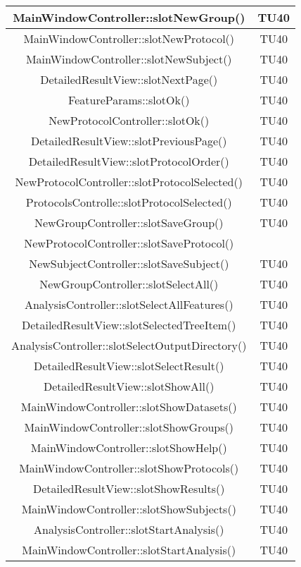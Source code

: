 \begin{center}
\begin{longtable}{|c|c|}
\hline 
MainWindowController::slotNewGroup() & TU40 \\
\hline 
MainWindowController::slotNewProtocol() & TU40 \\
\hline 
MainWindowController::slotNewSubject() & TU40 \\
\hline 
DetailedResultView::slotNextPage() & TU40 \\
\hline 
FeatureParams::slotOk() & TU40 \\
\hline 
NewProtocolController::slotOk() & TU40 \\
\hline 
DetailedResultView::slotPreviousPage() & TU40 \\
\hline 
DetailedResultView::slotProtocolOrder() & TU40 \\
\hline 
NewProtocolController::slotProtocolSelected() & TU40 \\
\hline 
ProtocolsControlle::slotProtocolSelected() & TU40 \\
\hline 
NewGroupController::slotSaveGroup() & TU40 \\
\hline 
NewProtocolController::slotSaveProtocol() &  \\
\hline 
NewSubjectController::slotSaveSubject() & TU40 \\
\hline 
NewGroupController::slotSelectAll() & TU40 \\
\hline 
AnalysisController::slotSelectAllFeatures() & TU40 \\
\hline 
DetailedResultView::slotSelectedTreeItem() & TU40 \\
\hline 
AnalysisController::slotSelectOutputDirectory() & TU40 \\
\hline 
DetailedResultView::slotSelectResult() & TU40 \\
\hline 
DetailedResultView::slotShowAll() & TU40 \\
\hline 
MainWindowController::slotShowDatasets() & TU40 \\
\hline 
MainWindowController::slotShowGroups() & TU40 \\
\hline 
MainWindowController::slotShowHelp() & TU40 \\
\hline 
MainWindowController::slotShowProtocols() & TU40 \\
\hline 
DetailedResultView::slotShowResults() & TU40 \\
\hline 
MainWindowController::slotShowSubjects() & TU40 \\
\hline 
AnalysisController::slotStartAnalysis() & TU40 \\
\hline 
MainWindowController::slotStartAnalysis() & TU40 \\

\end{longtable}
\end{center}

